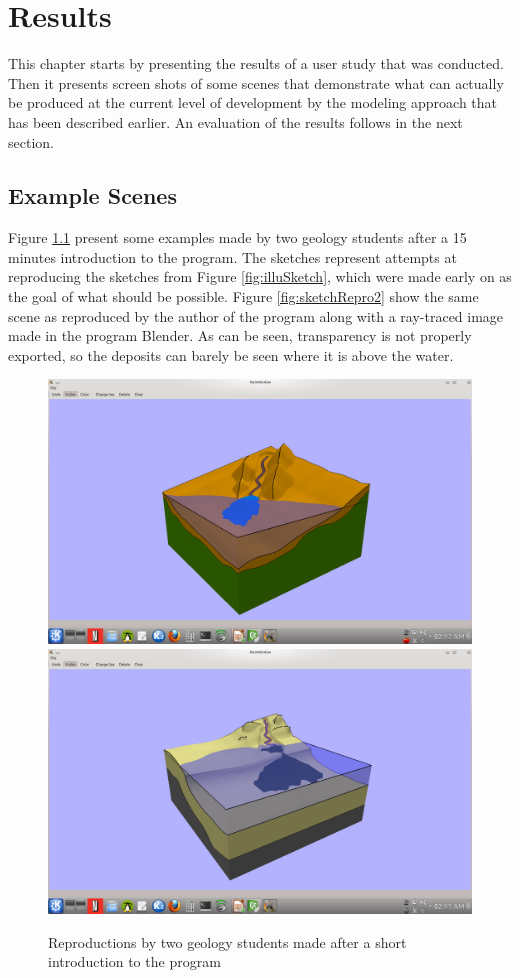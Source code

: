 \documentclass[a4paper,12pt]{report}
\begin{document}
\chapter{Results}
This chapter starts by presenting the results of a user study that was conducted. Then it presents screen shots of some scenes that demonstrate what can actually be produced at the current level of development by the modeling approach that has been described earlier. An evaluation of the results follows in the next section.
\label{sec:results}

\section{Example Scenes}
Figure \ref{fig:sketchRepro} present some examples made by two geology students after a 15 minutes introduction to the program. The sketches represent attempts at reproducing the sketches from Figure \ref{fig:illuSketch}, which were made early on as the goal of what should be possible. Figure \ref{fig:sketchRepro2} show the same scene as reproduced by the author of the program along with a ray-traced image made in the program Blender. As can be seen, transparency is not properly exported, so the deposits can barely be seen where it is above the water.

\begin{figure}
\includegraphics[trim = 90mm 22mm 80mm 30mm, clip,width=.5\linewidth]{thesis/resultsSection/sketch/user.png}
\includegraphics[trim = 90mm 22mm 80mm 30mm, clip,width=.5\linewidth]{thesis/resultsSection/sketch/user2.png}
 \caption{Reproductions by two geology students made after a short introduction to the program}
 \label{fig:sketchRepro}
\end{figure}
\end{document}
